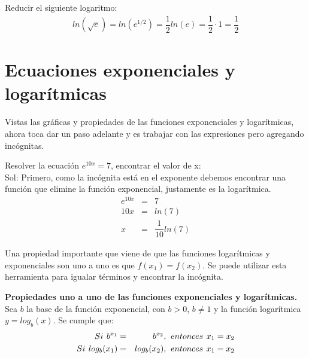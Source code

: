 \begin{myexample}
Reducir el siguiente logaritmo:
\begin{eqnarray}
ln(\sqrt{e})=ln(e^{1/2})=\dfrac{1}{2}ln(e)=\dfrac{1}{2}\cdot 1=\dfrac{1}{2}
\end{eqnarray}
\end{myexample}

\section{Ecuaciones exponenciales y logarítmicas}
Vistas las gráficas y propiedades de las funciones exponenciales y logarítmicas, ahora toca dar un paso adelante y es trabajar con las expresiones pero agregando incógnitas. 

\begin{myexample}
Resolver la ecuación $e^{10x}=7$, encontrar el valor de x:\\

\noindent Sol: Primero, como la incógnita está en el exponente debemos encontrar una función que elimine la función exponencial, justamente es la logarítmica.
\begin{eqnarray*}
e^{10x}&=&7\\
10x&=&ln(7)\\
x&=&\dfrac{1}{10}ln(7)
\end{eqnarray*}
\end{myexample}

Una propiedad importante que viene de que las funciones logarítmicas y exponenciales son uno a uno es que $f(x_{1})=f(x_{2})$. Se puede utilizar esta herramienta para igualar términos y encontrar la incógnita.

\begin{mydef}
\textbf{Propiedades uno a uno de las funciones exponenciales y logarítmicas.} Sea $b$ la base de la función exponencial, con $b>0$, $b\neq 1$ y la función logarítmica $y=log_{b}(x)$. Se cumple que:
\begin{eqnarray}
Si\hspace{4px} b^{x_{1}} &=& b^{x_{2}},\hspace{4px} entonces\hspace{4px} x_{1}=x_{2}\\
Si\hspace{4px} log_{b}(x_{1})&=&log_{b}(x_{2}),\hspace{4px} entonces\hspace{4px} x_{1}=x_{2}
\end{eqnarray}
\end{mydef}

